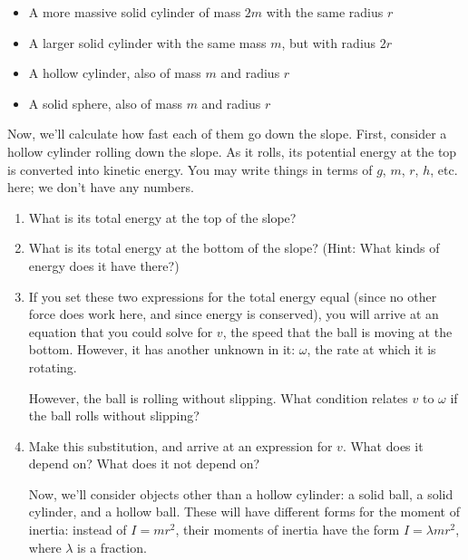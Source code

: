 \documentclass[12pt]{article}
\begin{document}
\begin{enumerate}
{\begin{itemize}
\item A more massive solid cylinder of mass $2m$ with the same radius $r$
\item A larger solid cylinder with the same mass $m$, but with radius $2r$
\item A hollow cylinder, also of mass $m$ and radius $r$
\item A solid sphere, also of mass $m$ and radius $r$
\end{itemize}

\vspace{0.4in}

Now, we'll calculate how fast each of them go down the slope. First, consider a hollow cylinder rolling down the slope. As it rolls, its potential energy at the top is converted into kinetic energy. You may write things in terms of $g$, $m$, $r$, $h$, etc. here; we don't have any numbers.

\begin{enumerate}
	\item What is its total energy at the top of the slope?
\vspace{0.7in}

    \item What is its total energy at the bottom of the slope? (Hint: What kinds of energy does it have there?)
    
    \vspace{1in}
    
    \item If you set these two expressions for the total energy equal (since no other force does work here, and since energy is conserved), you will arrive at an equation that you could solve for $v$, the speed that the ball is moving at the bottom. However, it has another unknown in it: $\omega$, the rate at which it is rotating.
    
    However, the ball is rolling without slipping. What condition relates $v$ to $\omega$ if the ball rolls without slipping?
    
    \vspace{1in}
    \newpage
    
    \item Make this substitution, and arrive at an expression for $v$. What does it depend on? What does it not depend on?
    
    \vspace{2.5in}
    
    Now, we'll consider objects other than a hollow cylinder: a solid ball, a solid cylinder, and a hollow ball. These will have different forms for the moment of inertia: instead of $I=mr^2$, their moments of inertia have the form $I=\lambda mr^2$, where $\lambda$ is a fraction. 
    

\end{enumerate}}
\end{enumerate}
\end{document}
